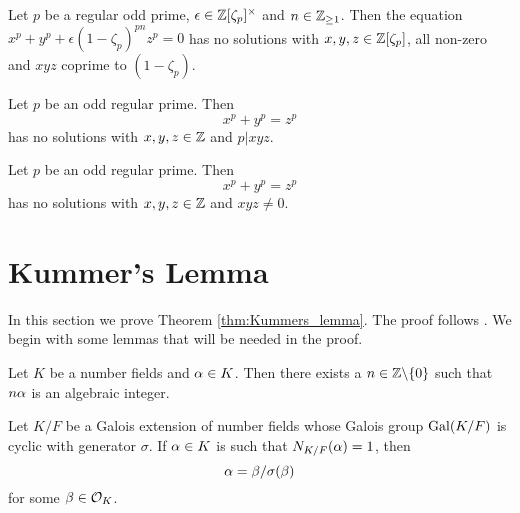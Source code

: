 \begin{theorem}\label{thm:gen_flt_eqn}
	Let $p$ be a regular odd prime, $\epsilon \in \mathbb{Z}[\zeta_p]^\times$ and $n \in \mathbb{Z}_{\geq 1}$. Then the equation $x^p+y^p+\epsilon(1-\zeta_p)^{pn}z^p=0$ has no solutions with $x,y,z \in \mathbb{Z}[\zeta_p]$, all non-zero and $xyz$ coprime to $(1-\zeta_p)$.
\end{theorem}

\begin{theorem}\label{theorem:FLT_case_two}
	\leanok
	Let $p$ be an odd regular prime. Then \[x^p+y^p=z^p\] has no solutions with $x,y,z \in \mathbb{Z}$ and $p | xyz$.
\end{theorem}


\begin{theorem}\label{FLT_regular}
	\leanok
	Let $p$ be an odd regular prime.  Then \[x^p+y^p=z^p\] has no solutions with $x,y,z \in \mathbb{Z}$ and $xyz \ne 0$.
\end{theorem}

\section{Kummer's Lemma}

In this section we prove Theorem \ref{thm:Kummers_lemma}. The proof follows \cite{SD}. We begin with some lemmas that will be needed in the proof.


\begin{lemma}\label{lem:exists_alg_int}
	Let $K$ be a number fields and $\alpha \in K$. Then there exists a $n \in \mathbb{Z}\backslash\{0\}$ such that $n \alpha$ is an algebraic integer.  
\end{lemma}

\begin{theorem}\label{Hilbert90}
Let $K/F$ be a Galois extension of number fields whose Galois group $\operatorname{Gal}(K/F)$ is cyclic with generator $\sigma$. If $\alpha \in K$ is such that $N_{K/F}(\alpha)=1$, then \[ \alpha =\beta/ \sigma(\beta)\] for some $\beta \in \mathcal{O}_K$. 


\end{theorem}

